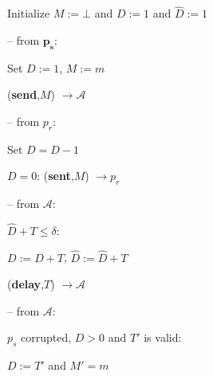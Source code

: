 \begin{bbox}[title={\textbf{Functionality} $\F_{\msf{BD-SEC}}^{\delta,\ell}(p_s,p_r)$}]

Initialize $M := \bot$ and $D := 1$ and $\hat{D} := 1$

-- \OnInput {} from $\mathbf{p_s}$:

	\dquad Set $D := 1$, $M := m$

	\dquad \Leak ({\bf send},$M$) $\rightarrow \mathcal{A}$

-- \OnInput {} from $p_r$:

	\dquad Set $D = D - 1$

	\dquad \If $D = 0$: \Send ({\bf sent},$M$) $\rightarrow p_r$

-- \OnInput {} from $\mathcal{A}$:

	\qquad \If $\hat{D} + T \leq \delta$: 

		\qquad \quad $D := D + T$, $\hat{D} := \hat{D} + T$

		\qquad \quad \Send ({\bf delay},$T$) $\rightarrow \mathcal{A}$

-- \OnInput {} from $\mathcal{A}$:

	\qquad \If $p_s$ corrupted, $D > 0$ and $T'$ is valid:

		\qquad \quad $D := T'$ and $M' = m$
\end{bbox}

